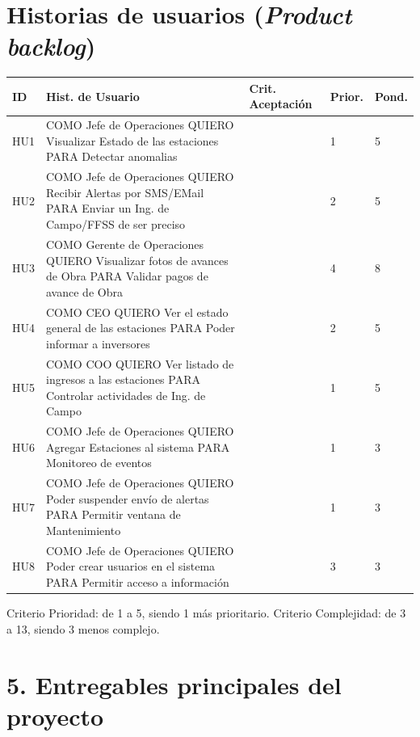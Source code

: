 \documentclass[11pt]{charter}
\begin{document}
\section{Historias de usuarios (\textit{Product backlog})}
\label{sec:backlog}

\begin{consigna} 
\begin{table}
\begin{tabularx}{\linewidth}{@{}|l|X|X|l|l|@{}}
\hline
\rowcolor[HTML]{C0C0C0} 
ID  & Hist. de Usuario & Crit. Aceptación & Prior. & Pond. \\ \hline
HU1 & COMO Jefe de Operaciones 
QUIERO Visualizar Estado de las estaciones 
PARA Detectar anomalias      & 	 & 1   & 5 	\\ \hline
HU2 & COMO Jefe de Operaciones 
QUIERO Recibir Alertas por SMS/EMail 
PARA Enviar un Ing. de Campo/FFSS de ser preciso   & 	& 2     & 5 	\\ \hline
HU3 & COMO Gerente de Operaciones 
QUIERO Visualizar fotos de avances de Obra 
PARA Validar pagos de avance de Obra  & 	&  4  & 8   	\\ \hline
HU4 & COMO CEO 
QUIERO Ver el estado general de las estaciones  
PARA Poder informar a inversores       & &  2 & 5	\\ \hline
HU5 & COMO COO 
QUIERO Ver listado de ingresos a las estaciones 
PARA Controlar actividades de Ing. de Campo &           	&   1  & 5  	\\ \hline
HU6 & COMO Jefe de Operaciones 
QUIERO Agregar Estaciones al sistema 
PARA Monitoreo de eventos  &  	& 1  & 3 \\ \hline
HU7 & COMO Jefe de Operaciones 
QUIERO Poder suspender envío de alertas 
PARA Permitir ventana de Mantenimiento  &   &  1 &  3	\\ \hline
HU8 & COMO Jefe de Operaciones 
QUIERO Poder crear usuarios en el sistema 
PARA Permitir acceso a información  &   &  3 &  3	\\ \hline

\end{tabularx}
\end{table}

Criterio Prioridad: de 1 a 5, siendo 1 más prioritario. 
Criterio Complejidad: de 3 a 13, siendo 3 menos complejo. 

\end{consigna}

\section{5. Entregables principales del proyecto}
\label{sec:entregables}
\end{document}
